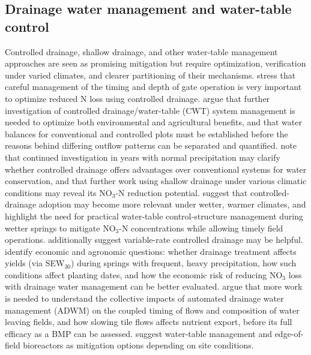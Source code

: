 \documentclass[11pt]{article}
\begin{document}
\subsection{Drainage water management and water-table control}
Controlled drainage, shallow drainage, and other water-table management approaches are seen as promising mitigation but require optimization, verification under varied climates, and clearer partitioning of their mechanisms. \textcite{Fang2012} stress that careful management of the timing and depth of gate operation is very important to optimize reduced N loss using controlled drainage. \textcite{Wesström2001} argue that further investigation of controlled drainage/water-table (CWT) system management is needed to optimize both environmental and agricultural benefits, and that water balances for conventional and controlled plots must be established before the reasons behind differing outflow patterns can be separated and quantified. \textcite{Smith2011b} note that continued investigation in years with normal precipitation may clarify whether controlled drainage offers advantages over conventional systems for water conservation, and that further work using shallow drainage under various climatic conditions may reveal its NO$_3$-N reduction potential. \textcite{Madramootoo2024} suggest that controlled-drainage adoption may become more relevant under wetter, warmer climates, and highlight the need for practical water-table control-structure management during wetter springs to mitigate NO$_3$-N concentrations while allowing timely field operations. \textcite{Bakhsh2007} additionally suggest variable-rate controlled drainage may be helpful. \textcite{Schott2017b} identify economic and agronomic questions: whether drainage treatment affects yields (via SEW$_{30}$) during springs with frequent, heavy precipitation, how such conditions affect planting dates, and how the economic risk of reducing NO$_3$ loss with drainage water management can be better evaluated. \textcite{Miller2022} argue that more work is needed to understand the collective impacts of automated drainage water management (ADWM) on the coupled timing of flows and composition of water leaving fields, and how slowing tile flows affects nutrient export, before its full efficacy as a BMP can be assessed. \textcite{Barkle2021} suggest water-table management and edge-of-field bioreactors as mitigation options depending on site conditions.
\end{document}
